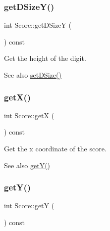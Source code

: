\subsubsection{\texorpdfstring{get\+D\+Size\+Y()}{getDSizeY()}}
{\footnotesize\ttfamily int Score\+::get\+D\+SizeY (\begin{DoxyParamCaption}{ }\end{DoxyParamCaption}) const\hspace{0.3cm}{\ttfamily [inline]}}



Get the height of the digit. 

\begin{DoxySeeAlso}{See also}
\mbox{\hyperlink{class_score_a86b1e2a967847b148f79504ef7d4e866}{set\+D\+Size()}} 
\end{DoxySeeAlso}
\mbox{\label{class_score_aaae02b51a637062330b3259952974ae8}} 
\subsubsection{\texorpdfstring{get\+X()}{getX()}}
{\footnotesize\ttfamily int Score\+::getX (\begin{DoxyParamCaption}{ }\end{DoxyParamCaption}) const\hspace{0.3cm}{\ttfamily [inline]}}



Get the x coordinate of the score. 

\begin{DoxySeeAlso}{See also}
\mbox{\hyperlink{class_score_a669f6def2fbf922750ce054a0fd0b915}{get\+Y()}} 
\end{DoxySeeAlso}
\mbox{\label{class_score_a669f6def2fbf922750ce054a0fd0b915}} 
\subsubsection{\texorpdfstring{get\+Y()}{getY()}}
{\footnotesize\ttfamily int Score\+::getY (\begin{DoxyParamCaption}{ }\end{DoxyParamCaption}) const\hspace{0.3cm}{\ttfamily [inline]}}



